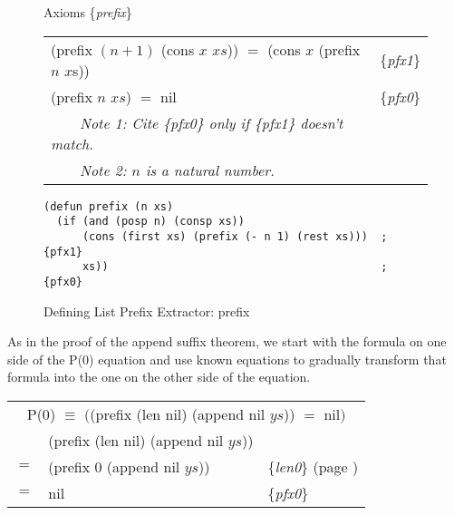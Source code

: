 \begin{figure}
\begin{center}
Axioms \{\emph{prefix}\}                                           \\
\begin{tabular}{ll}
\hline
\textsf{(prefix $(n + 1)$ (cons $x$ $xs$))} $=$ \textsf{(cons $x$ (prefix $n$ $x$s))} & \{\emph{pfx1}\} \\
\textsf{(prefix $n$ $xs$)} $=$  \textsf{nil}                                          & \{\emph{pfx0}\} \\
~~~~\emph{Note 1: Cite \{\emph{pfx0}\} only if \{\emph{pfx1}\} doesn't match.}&\\
~~~~\emph{Note 2: $n$ is a natural number.}
\end{tabular}
\begin{code}
\begin{verbatim}
(defun prefix (n xs)
  (if (and (posp n) (consp xs))
      (cons (first xs) (prefix (- n 1) (rest xs)))  ; {pfx1}
      xs))                                          ; {pfx0}
\end{verbatim}
\end{code}
\end{center}
\caption{Defining List Prefix Extractor: \textsf{prefix}}
\label{prefix-equations}
\end{figure}

As in the proof of the append suffix theorem, we start
with the formula on one side of the P(0) equation
and use known equations to gradually transform
that formula into the one on the other side of the equation.
\begin{center}
\begin{tabular}{lll}
\multicolumn{3}{c}{P($0$) $\equiv$ $($\textsf{(prefix (len nil) (append nil $ys$))} $=$ \textsf{nil}$)$}\\
    & \textsf{(prefix (len nil) (append nil $ys$))}  &                                                  \\
$=$ & \textsf{(prefix 0 (append nil $ys$))}          & \{\emph{len0}\} (page \pageref{len-equations})   \\
$=$ & \textsf{nil}                                   & \{\emph{pfx0}\}                                  \\
\end{tabular}
\end{center}

